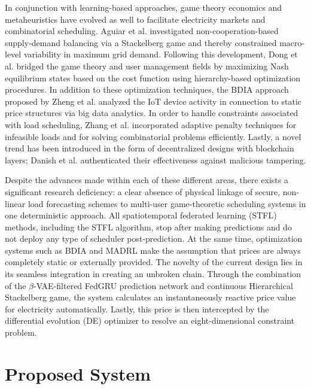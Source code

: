 \documentclass[journal]{IEEEtran}
\begin{document}
In conjunction with learning-based approaches, game theory economics and metaheuristics have evolved as well to facilitate electricity markets and combinatorial scheduling. Aguiar et al. \cite{aguiar2021network-constrained} investigated non-cooperation-based supply-demand balancing via a Stackelberg game and thereby constrained macro-level variability in maximum grid demand. Following this development, Dong et al. \cite{dong2020energy} bridged the game theory and user management fields by maximizing Nash equilibrium states based on the cost function using hierarchy-based optimization procedures. In addition to these optimization techniques, the BDIA approach proposed by Zheng et al. \cite{bdia2025} analyzed the IoT device activity in connection to static price structures via big data analytics. In order to handle constraints associated with load scheduling, Zhang et al. \cite{zhang2025aggregator-grid} incorporated adaptive penalty techniques for infeasible loads and for solving combinatorial problems efficiently. Lastly, a novel trend has been introduced in the form of decentralized designs with blockchain layers; Danish et al. \cite{danish2025block-fedl:} authenticated their effectiveness against malicious tampering.

Despite the advances made within each of these different areas, there exists a significant research deficiency: a clear absence of physical linkage of secure, non-linear load forecasting schemes to multi-user game-theoretic scheduling systems in one deterministic approach. All spatiotemporal federated learning (STFL) methods, including the STFL algorithm, stop after making predictions and do not deploy any type of scheduler post-prediction. At the same time, optimization systems such as BDIA and MADRL make the assumption that prices are always completely static or externally provided. The novelty of the current design lies in its seamless integration in creating an unbroken chain. Through the combination of the $\beta$-VAE-filtered FedGRU prediction network and continuous Hierarchical Stackelberg game, the system calculates an instantaneously reactive price value for electricity automatically. Lastly, this price is then intercepted by the differential evolution (DE) optimizer to resolve an eight-dimensional constraint problem.

\section{Proposed System}
\end{document}
